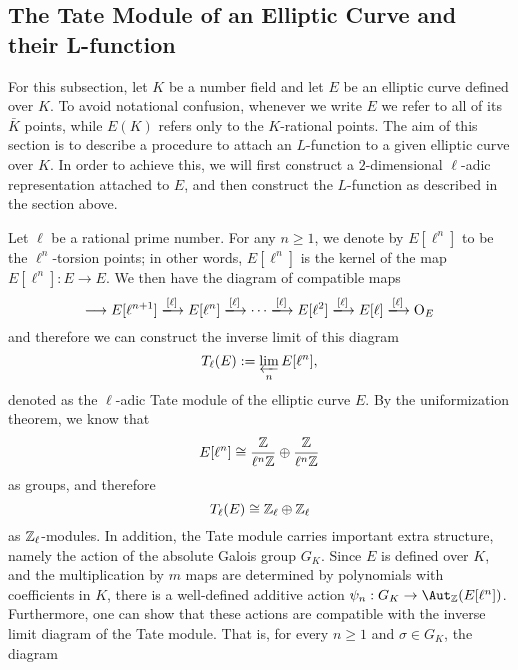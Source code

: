 
\subsection{The Tate Module of an Elliptic Curve and their L-function}
For this subsection, let $K$ be a number field and let $E$ be an elliptic curve defined over $K$. To avoid notational confusion, whenever we write $E$ we refer to all of its $\bar{K}$ points, while $E(K)$ refers only to the $K$-rational points. The aim of this section is to describe a procedure to attach an $L$-function to a given elliptic curve over $K$. In order to achieve this, we will first construct a $2$-dimensional $\ell$-adic representation attached to $E$, and then construct the $L$-function as described in the section above.

Let $\ell$ be a rational prime number. For any $n\geq1$, we denote by $E[\ell^n]$ to be the $\ell^n$-torsion points; in other words, $E[\ell^n]$ is the kernel of the map $E[\ell^n]:E\to E$. We then have the diagram of compatible maps
\[
    \longrightarrow E[\ell^{n+1}]\xlongrightarrow{[\ell]} E[\ell^{n}]\xlongrightarrow{[\ell]}\cdots\xlongrightarrow{[\ell]} E[\ell^2]\xlongrightarrow{[\ell]} E[\ell]\xlongrightarrow{[\ell]} \mathrm{O}_E 
\] 
and therefore we can construct the inverse limit of this diagram
$$T_\ell(E):=\varprojlim_{n}E[\ell^n],$$
denoted as the $\ell$-adic Tate module of the elliptic curve $E$. By the uniformization theorem, we know that 
$$E[\ell^n]\cong\frac{\mathbb{Z}}{\ell^n\mathbb{Z}}\oplus\frac{\mathbb{Z}}{\ell^n\mathbb{Z}}$$
as groups, and therefore 
$$T_\ell(E)\cong\mathbb{Z}_\ell\oplus\mathbb{Z}_\ell$$
as $\mathbb{Z}_\ell$-modules. In addition, the Tate module carries important extra structure, namely the action of the absolute Galois group $G_K$. Since $E$ is defined over $K$, and the multiplication by $m$ maps are determined by polynomials with coefficients in $K$, there is a well-defined additive action $\psi_n:G_K\rightarrow\Aut_{\ZZ}(E[\ell^n])$. Furthermore, one can show that these actions are compatible with the inverse limit diagram of the Tate module. That is, for every $n\geq 1$ and $\sigma\in G_K$, the diagram


\begin{center}
\end{center}

